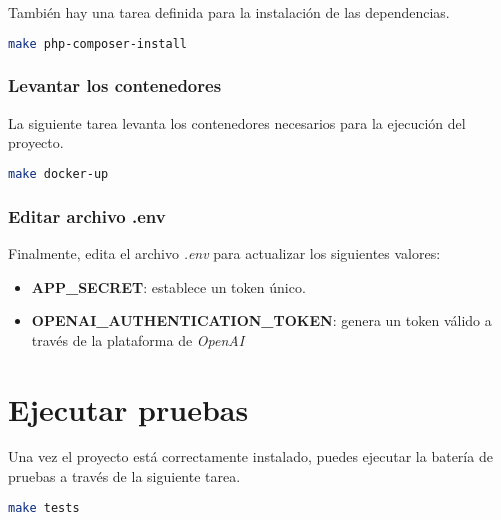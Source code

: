 También hay una tarea definida para la instalación de las dependencias.

\begin{lstlisting}[language=bash]
make php-composer-install
\end{lstlisting}

\subsubsection*{Levantar los contenedores}\label{subsubsec:levantar_contenedores}

La siguiente tarea levanta los contenedores necesarios para la ejecución del proyecto.

\begin{lstlisting}[language=bash]
make docker-up
\end{lstlisting}

\subsubsection*{Editar archivo .env}\label{subsubsec:editar_env}

Finalmente, edita el archivo \textit{.env} para actualizar los siguientes valores:

\begin{itemize}
    \item \textbf{APP\_SECRET}: establece un token único.
    \item \textbf{OPENAI\_AUTHENTICATION\_TOKEN}: genera un token válido a través de la plataforma de \textit{OpenAI}~
    \cite{url_openai_platform}
\end{itemize}


\section*{Ejecutar pruebas}\label{sec:ejecutar_pruebas}

Una vez el proyecto está correctamente instalado, puedes ejecutar la batería de pruebas a través de la siguiente tarea.

\begin{lstlisting}[language=bash]
make tests
\end{lstlisting}